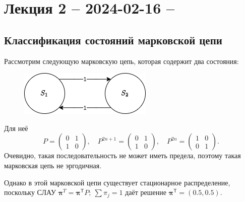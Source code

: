 \section{Лекция 2 -- 2024-02-16 -- }
\subsection{Классификация состояний марковской цепи}
\begin{ex}
  Рассмотрим следующую марковскую цепь, которая содержит два состояния:
  \begin{figure}[h!]
    \centering
    \includegraphics[width=0.3\linewidth]{stoproc/Figures/lec2-ex1}
  \end{figure}
 
  Для неё
  \[
    P = \begin{pmatrix}
      0 & 1 \\
      1 & 0
    \end{pmatrix}, \quad
    P^{2n + 1} = \begin{pmatrix}
      0 & 1 \\
      1 & 0
    \end{pmatrix}, \quad
    P^{2n} = \begin{pmatrix}
      1 & 0 \\
      0 & 1
    \end{pmatrix}.
  \]
  Очевидно, такая последовательность не может иметь предела, поэтому такая марковская цепь не
  эргодичная.

  Однако в этой марковской цепи существует стационарное распределение, поскольку СЛАУ
  $\bm\pi^T = \bm\pi^{\mathsf T} P;\ \sum \pi_j = 1$ даёт решение
  $\bm\pi^{\mathsf T} = (0.5, 0.5)$.
\end{ex}

